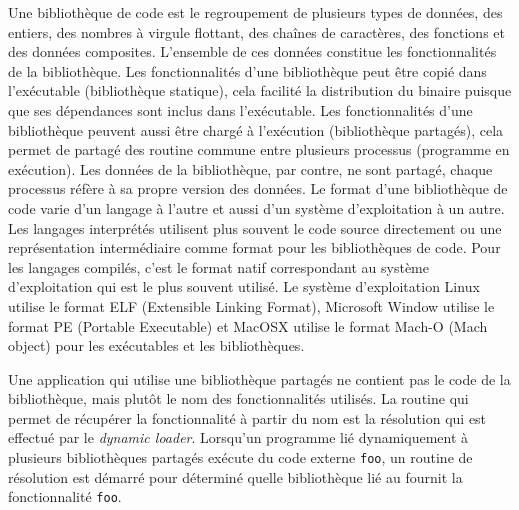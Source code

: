 \documentclass[12pt,initial,twoside,maitrise]{dms}
\numberwithin{equation}{section}
\numberwithin{table}{chapter}
\numberwithin{figure}{chapter}
\begin{document}

Une bibliothèque de code est le regroupement de plusieurs types
de données, des entiers, des nombres à virgule flottant, des chaînes
de caractères, des fonctions et des données composites. L'ensemble
de ces données constitue les fonctionnalités de la bibliothèque.
Les fonctionnalités d'une bibliothèque peut être copié dans l'exécutable
(bibliothèque statique), cela facilité la distribution du binaire puisque
que ses dépendances sont inclus dans l'exécutable.
Les fonctionnalités d'une bibliothèque peuvent aussi être chargé
à l'exécution (bibliothèque partagés), cela permet de partagé des routine
commune entre plusieurs processus (programme en exécution). Les données de
la bibliothèque, par contre, ne sont partagé, chaque processus réfère à
sa propre version des données.
Le format d'une bibliothèque de code varie d'un langage à l'autre et aussi d'un
système d'exploitation à un autre. Les langages interprétés utilisent plus
souvent le code source directement ou une représentation intermédiaire comme format pour
les bibliothèques de code.
Pour les langages compilés, c'est le format natif correspondant au système d'exploitation
qui est le plus souvent utilisé. Le système d'exploitation Linux utilise le
format ELF (Extensible Linking Format), Microsoft Window utilise le format PE (Portable Executable)
et MacOSX utilise le format Mach-O (Mach object) pour les exécutables et les bibliothèques.





Une application qui utilise une bibliothèque partagés ne contient pas le
code de la bibliothèque, mais plutôt le nom des fonctionnalités utilisés.
La routine qui permet de récupérer la fonctionnalité
à partir du nom est la résolution qui est effectué par le \textit{dynamic loader}.
Lorsqu'un programme lié dynamiquement
à plusieurs bibliothèques partagés exécute du code externe \verb|foo|,
un routine de résolution est démarré pour déterminé quelle bibliothèque
lié au fournit la fonctionnalité \verb|foo|.
\end{document}
